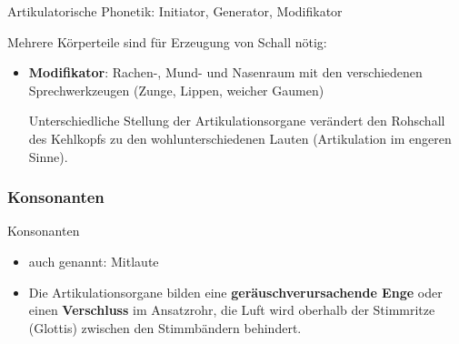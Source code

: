 \begin{frame}{Artikulatorische Phonetik: Initiator, Generator, Modifikator}

Mehrere Körperteile sind für Erzeugung von Schall nötig:

	\begin{itemize}
		\item \textbf{Modifikator}: Rachen-, Mund- und Nasenraum mit den verschiedenen Sprechwerkzeugen (Zunge, Lippen, weicher Gaumen) \ras
		
		Unterschiedliche Stellung der Artikulationsorgane verändert den Rohschall des Kehlkopfs zu den wohlunterschiedenen Lauten (Artikulation im engeren Sinne).
	\end{itemize}
	
\end{frame}


\subsubsection{Konsonanten}

\begin{frame}{Konsonanten}

	\begin{itemize}
		\item auch genannt: Mitlaute
		
		\item Die Artikulationsorgane bilden eine \textbf{geräuschverursachende Enge} oder einen \textbf{Verschluss} im Ansatzrohr, \dash die Luft wird oberhalb der Stimmritze (Glottis) zwischen den Stimmbändern behindert.
	\end{itemize}
	
\end{frame}


